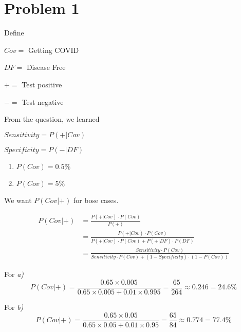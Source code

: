 \section*{Problem 1}

\begin{note}{Define}
    \begin{list}{}{}
        \item $Cov =$ Getting COVID
        \item $DF =$ Disease Free
        \item $+ =$ Test positive
        \item $- =$ Test negative
    \end{list}
\end{note}

\noindent From the question, we learned
\begin{list}{}{}
    \item $Sensitivity = P(+|Cov)$
    \item $Specificity = P(-|DF)$
\end{list}

\begin{enumerate}[label=\alph*)]
    \item $P(Cov)=0.5\%$
    \item $P(Cov)=5\%$
\end{enumerate}

\noindent We want $P(Cov|+)$ for bose cases.

\begin{align*}
    P(Cov|+) &= \frac{P(+|Cov)\cdot P(Cov)}{P(+)} \\
                &= \frac{P(+|Cov)\cdot P(Cov)}{P(+|Cov)\cdot P(Cov) + P(+|DF)\cdot P(DF)} \\
                &= \frac{Sensitivity\cdot P(Cov)}{Sensitivity\cdot P(Cov) + (1-Specificity)\cdot (1-P(Cov))}
\end{align*}

For \textit{a)} $$P(Cov|+) = \frac{0.65\times 0.005}{0.65\times 0.005 + 0.01\times 0.995} = \frac{65}{264} \approx 0.246 = 24.6\%$$

For \textit{b)} $$P(Cov|+) = \frac{0.65\times 0.05}{0.65\times 0.05 + 0.01\times 0.95} = \frac{65}{84} \approx 0.774 = 77.4\% $$